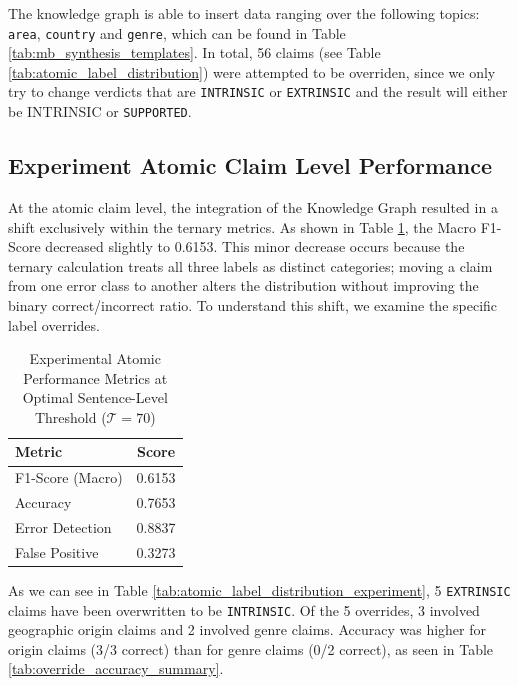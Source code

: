 The knowledge graph is able to insert data ranging over the following topics: \texttt{area}, \texttt{country} and \texttt{genre}, which can be found in Table \ref{tab:mb_synthesis_templates}. In total, 56 claims (see Table \ref{tab:atomic_label_distribution}) were attempted to be overriden, since we only try to change verdicts that are \texttt{INTRINSIC} or \texttt{EXTRINSIC} and the result will either be {INTRINSIC} or \texttt{SUPPORTED}. 

\subsection{Experiment Atomic Claim Level Performance}\label{res:experiment_atomic_claims}
At the atomic claim level, the integration of the Knowledge Graph resulted in a shift exclusively within the ternary metrics. As shown in Table \ref{tab:experiment_atomic_metrics}, the Macro F1-Score decreased slightly to 0.6153. This minor decrease occurs because the ternary calculation treats all three labels as distinct categories; moving a claim from one error class to another alters the distribution without improving the binary correct/incorrect ratio. To understand this shift, we examine the specific label overrides.

\begin{table}[htbp]
    \centering
    \caption{Experimental Atomic Performance Metrics at Optimal Sentence-Level Threshold ($\mathcal{T} = 70$)}
    \label{tab:experiment_atomic_metrics}
    \begin{tabular}{lc}
        \toprule
        \textbf{Metric} & \textbf{Score} \\
        \midrule
        F1-Score (Macro) &    0.6153 \\ 
        Accuracy &            0.7653 \\ 
        Error Detection &     0.8837 \\ 
        False Positive &      0.3273 \\ 
        \bottomrule
    \end{tabular}
\end{table}

As we can see in Table \ref{tab:atomic_label_distribution_experiment}, 5 \texttt{EXTRINSIC} claims have been overwritten to be \texttt{INTRINSIC}. Of the 5 overrides, 3 involved geographic origin claims and 2 involved genre claims. Accuracy was higher for origin claims (3/3 correct) than for genre claims (0/2 correct), as seen in Table \ref{tab:override_accuracy_summary}.

